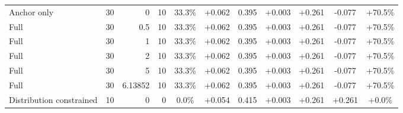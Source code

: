 \begin{table}[htbp]
\begin{tabular}{lrrrccccccc}
Anchor only & 30 & 0 & 10 & 33.3\% & +0.062 & 0.395 & +0.003 & +0.261 & -0.077 & +70.5\% \\
Full & 30 & 0.5 & 10 & 33.3\% & +0.062 & 0.395 & +0.003 & +0.261 & -0.077 & +70.5\% \\
Full & 30 & 1 & 10 & 33.3\% & +0.062 & 0.395 & +0.003 & +0.261 & -0.077 & +70.5\% \\
Full & 30 & 2 & 10 & 33.3\% & +0.062 & 0.395 & +0.003 & +0.261 & -0.077 & +70.5\% \\
Full & 30 & 5 & 10 & 33.3\% & +0.062 & 0.395 & +0.003 & +0.261 & -0.077 & +70.5\% \\
Full & 30 & 6.13852 & 10 & 33.3\% & +0.062 & 0.395 & +0.003 & +0.261 & -0.077 & +70.5\% \\
Distribution constrained & 10 & 0 & 0 & 0.0\% & +0.054 & 0.415 & +0.003 & +0.261 & +0.261 & +0.0\% \\
\bottomrule
\end{tabular}
\end{table}